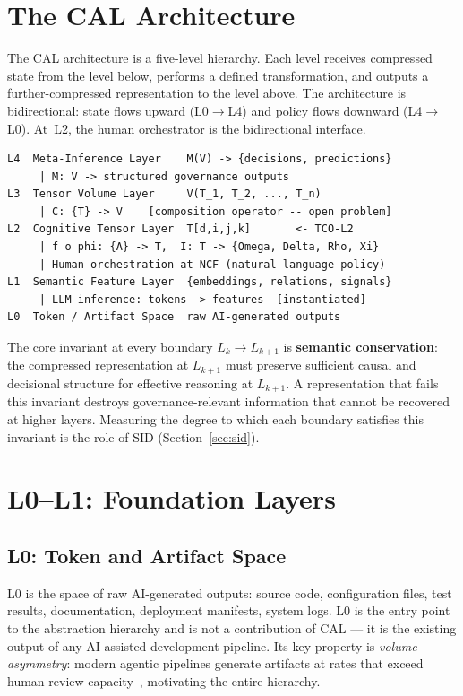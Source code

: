\documentclass[11pt]{article}
\theoremstyle{definition}
\theoremstyle{remark}
\begin{document}
\section{The CAL Architecture}

The CAL architecture is a five-level hierarchy. Each level receives
compressed state from the level below, performs a defined
transformation, and outputs a further-compressed representation to
the level above. The architecture is bidirectional: state flows
upward (L0$\to$L4) and policy flows downward (L4$\to$L0). At~L2,
the human orchestrator is the bidirectional interface.

\begin{lstlisting}[caption={CAL architecture overview}]
L4  Meta-Inference Layer    M(V) -> {decisions, predictions}
     | M: V -> structured governance outputs
L3  Tensor Volume Layer     V(T_1, T_2, ..., T_n)
     | C: {T} -> V    [composition operator -- open problem]
L2  Cognitive Tensor Layer  T[d,i,j,k]       <- TCO-L2
     | f o phi: {A} -> T,  I: T -> {Omega, Delta, Rho, Xi}
     | Human orchestration at NCF (natural language policy)
L1  Semantic Feature Layer  {embeddings, relations, signals}
     | LLM inference: tokens -> features  [instantiated]
L0  Token / Artifact Space  raw AI-generated outputs
\end{lstlisting}

The core invariant at every boundary $L_k \to L_{k+1}$ is
\textbf{semantic conservation}: the compressed representation at
$L_{k+1}$ must preserve sufficient causal and decisional structure
for effective reasoning at $L_{k+1}$. A representation that fails
this invariant destroys governance-relevant information that cannot
be recovered at higher layers. Measuring the degree to which each
boundary satisfies this invariant is the role of SID
(Section~\ref{sec:sid}).

\section{L0--L1: Foundation Layers}

\subsection{L0: Token and Artifact Space}

L0 is the space of raw AI-generated outputs: source code,
configuration files, test results, documentation, deployment
manifests, system logs. L0 is the entry point to the abstraction
hierarchy and is not a contribution of CAL --- it is the existing
output of any AI-assisted development pipeline. Its key property is
\emph{volume asymmetry}: modern agentic pipelines generate artifacts
at rates that exceed human review capacity~\cite{gitclear2025},
motivating the entire hierarchy.
\end{document}
